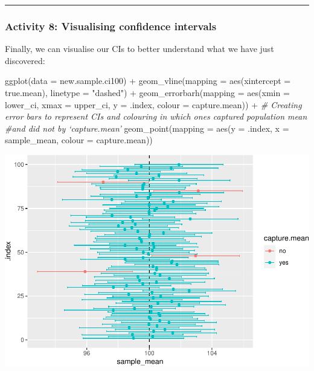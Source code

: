 \documentclass[
]{book}
\newenvironment{Shaded}{\begin{snugshade}}{\end{snugshade}}
\newcommand{\AttributeTok}[1]{\textcolor[rgb]{0.77,0.63,0.00}{#1}}
\newcommand{\CommentTok}[1]{\textcolor[rgb]{0.56,0.35,0.01}{\textit{#1}}}
\newcommand{\FunctionTok}[1]{\textcolor[rgb]{0.00,0.00,0.00}{#1}}
\newcommand{\NormalTok}[1]{#1}
\newcommand{\SpecialCharTok}[1]{\textcolor[rgb]{0.00,0.00,0.00}{#1}}
\newcommand{\StringTok}[1]{\textcolor[rgb]{0.31,0.60,0.02}{#1}}
\begin{document}
\begin{center}\rule{0.5\linewidth}{0.5pt}\end{center}

\hypertarget{activity-8-visualising-confidence-intervals}{%
\subsubsection{Activity 8: Visualising confidence intervals}\label{activity-8-visualising-confidence-intervals}}

Finally, we can visualise our CIs to better understand what we have just discovered:

\begin{Shaded}
\begin{Highlighting}[]
\FunctionTok{ggplot}\NormalTok{(}\AttributeTok{data =}\NormalTok{ new.sample.ci100) }\SpecialCharTok{+} 
  \FunctionTok{geom\_vline}\NormalTok{(}\AttributeTok{mapping =} \FunctionTok{aes}\NormalTok{(}\AttributeTok{xintercept =}\NormalTok{ true.mean), }\AttributeTok{linetype =} \StringTok{"dashed"}\NormalTok{) }\SpecialCharTok{+}
  \FunctionTok{geom\_errorbarh}\NormalTok{(}\AttributeTok{mapping =} \FunctionTok{aes}\NormalTok{(}\AttributeTok{xmin =}\NormalTok{ lower\_ci, }\AttributeTok{xmax =}\NormalTok{ upper\_ci, }\AttributeTok{y =}\NormalTok{ .index, }\AttributeTok{colour =}\NormalTok{ capture.mean)) }\SpecialCharTok{+} \CommentTok{\# Creating error bars to represent CIs and colouring in which ones captured population mean \#and did not by ‘capture.mean’}
  \FunctionTok{geom\_point}\NormalTok{(}\AttributeTok{mapping =} \FunctionTok{aes}\NormalTok{(}\AttributeTok{y =}\NormalTok{ .index, }\AttributeTok{x =}\NormalTok{ sample\_mean, }\AttributeTok{colour =}\NormalTok{ capture.mean))}
\end{Highlighting}
\end{Shaded}

\includegraphics{05-inferential-statistics_files/figure-latex/unnamed-chunk-37-1.pdf}
\end{document}

